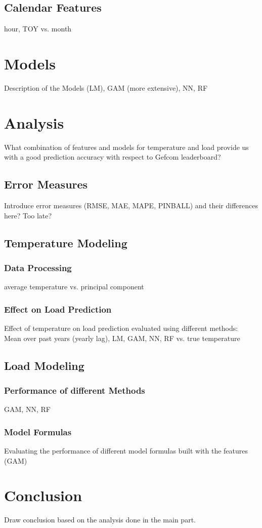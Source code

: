 \documentclass{article}
\begin{document}
\subsection{Calendar Features}
hour, TOY vs. month

\section{Models}
Description of the Models (LM), GAM (more extensive), NN, RF

\section{Analysis}
What combination of features and models for temperature and load provide us with a good prediction accuracy with respect to Gefcom leaderboard?

\subsection{Error Measures}
Introduce error measures (RMSE, MAE, MAPE, PINBALL) and their differences here? Too late?

\subsection{Temperature Modeling}
\subsubsection{Data Processing}
average temperature vs. principal component

\subsubsection{Effect on Load Prediction}
Effect of temperature on load prediction evaluated using different methods:\\
Mean over past years (yearly lag), LM, GAM, NN, RF vs. true temperature

\subsection{Load Modeling}

\subsubsection{Performance of different Methods}
GAM, NN, RF 

\subsubsection{Model Formulas}
Evaluating the performance of different model formulas built with the features (GAM)


\section{Conclusion}
Draw conclusion based on the analysis done in the main part.
\end{document}
